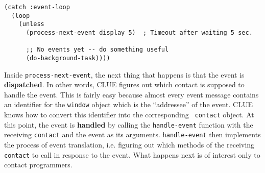 \begin{verbatim}
(catch :event-loop
  (loop
    (unless 
      (process-next-event display 5)  ; Timeout after waiting 5 sec.

      ;; No events yet -- do something useful
      (do-background-task))))
\end{verbatim}

\begin{center}
\end{center}

Inside {\tt process-next-event}, the next thing that happens is that the event is
{\bf dispatched}. In other words, CLUE figures out which contact is supposed to
handle the event. This is fairly easy because almost every event message
contains an identifier for the {\tt window} object which is the
``addressee'' of the
event. CLUE knows how to convert this identifier into the corresponding {\tt
contact} object. At this point, the event
is {\bf handled} by calling the {\tt handle-event}
function with the receiving {\tt contact} and the event as
its arguments. {\tt handle-event} then implements the process of event
translation, i.e. figuring out which methods of the receiving {\tt contact} to
call in response to the event\footnotemark{}.
What happens next is of interest only to contact programmers.

